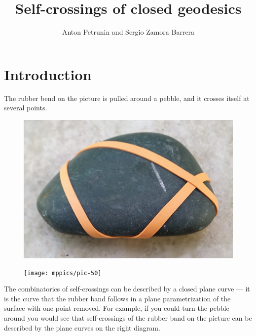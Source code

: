 \documentclass[oneside,a4paper]{amsart}
\begin{document}


\title{Self-crossings of closed geodesics}
\author{Anton Petrunin and Sergio Zamora Barrera}

\maketitle

\section{Introduction}


The rubber bend on the picture is pulled around a pebble,
and it crosses itself at several points.
\begin{figure}[!ht]
\begin{minipage}{.64\textwidth}
\centering
\includegraphics[width=\textwidth]{pics/pebble.jpg}
\end{minipage}\hfill
\begin{minipage}{.34\textwidth}
\centering
\texttt{[image: mppics/pic-50]}
\end{minipage}
\end{figure}
The combinatorics of self-crossings can be described by a closed plane curve --- it is the curve that the rubber band follows in a plane parametrization of the surface with one point removed.
For example, if you could turn the pebble around you would see that self-crossings of the rubber band on the picture can be described by the plane curves on the right diagram.
\end{document}
